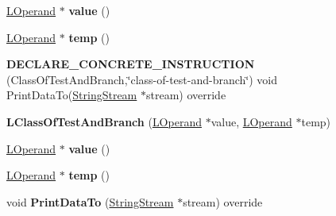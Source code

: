 \begin{DoxyCompactItemize}
\item 
\hyperlink{classv8_1_1internal_1_1_l_operand}{L\+Operand} $\ast$ {\bfseries value} ()\hypertarget{classv8_1_1internal_1_1_l_class_of_test_and_branch_a701d1d88a41fd46c94cc2d33ec5093b6}{}\label{classv8_1_1internal_1_1_l_class_of_test_and_branch_a701d1d88a41fd46c94cc2d33ec5093b6}

\item 
\hyperlink{classv8_1_1internal_1_1_l_operand}{L\+Operand} $\ast$ {\bfseries temp} ()\hypertarget{classv8_1_1internal_1_1_l_class_of_test_and_branch_ad6879400ca43794c61f3e6ac2829ddab}{}\label{classv8_1_1internal_1_1_l_class_of_test_and_branch_ad6879400ca43794c61f3e6ac2829ddab}

\item 
{\bfseries D\+E\+C\+L\+A\+R\+E\+\_\+\+C\+O\+N\+C\+R\+E\+T\+E\+\_\+\+I\+N\+S\+T\+R\+U\+C\+T\+I\+ON} (Class\+Of\+Test\+And\+Branch,\char`\"{}class-\/of-\/test-\/and-\/branch\char`\"{}) void Print\+Data\+To(\hyperlink{classv8_1_1internal_1_1_string_stream}{String\+Stream} $\ast$stream) override\hypertarget{classv8_1_1internal_1_1_l_class_of_test_and_branch_a029c33ea762efee5c0e2f13b702a3b6f}{}\label{classv8_1_1internal_1_1_l_class_of_test_and_branch_a029c33ea762efee5c0e2f13b702a3b6f}

\item 
{\bfseries L\+Class\+Of\+Test\+And\+Branch} (\hyperlink{classv8_1_1internal_1_1_l_operand}{L\+Operand} $\ast$value, \hyperlink{classv8_1_1internal_1_1_l_operand}{L\+Operand} $\ast$temp)\hypertarget{classv8_1_1internal_1_1_l_class_of_test_and_branch_a39178393b36ba59838196357be36ab79}{}\label{classv8_1_1internal_1_1_l_class_of_test_and_branch_a39178393b36ba59838196357be36ab79}

\item 
\hyperlink{classv8_1_1internal_1_1_l_operand}{L\+Operand} $\ast$ {\bfseries value} ()\hypertarget{classv8_1_1internal_1_1_l_class_of_test_and_branch_a701d1d88a41fd46c94cc2d33ec5093b6}{}\label{classv8_1_1internal_1_1_l_class_of_test_and_branch_a701d1d88a41fd46c94cc2d33ec5093b6}

\item 
\hyperlink{classv8_1_1internal_1_1_l_operand}{L\+Operand} $\ast$ {\bfseries temp} ()\hypertarget{classv8_1_1internal_1_1_l_class_of_test_and_branch_ad6879400ca43794c61f3e6ac2829ddab}{}\label{classv8_1_1internal_1_1_l_class_of_test_and_branch_ad6879400ca43794c61f3e6ac2829ddab}

\item 
void {\bfseries Print\+Data\+To} (\hyperlink{classv8_1_1internal_1_1_string_stream}{String\+Stream} $\ast$stream) override\hypertarget{classv8_1_1internal_1_1_l_class_of_test_and_branch_a819c364380cb5ef4061c61bc9745617c}{}\label{classv8_1_1internal_1_1_l_class_of_test_and_branch_a819c364380cb5ef4061c61bc9745617c}


\end{DoxyCompactItemize}
